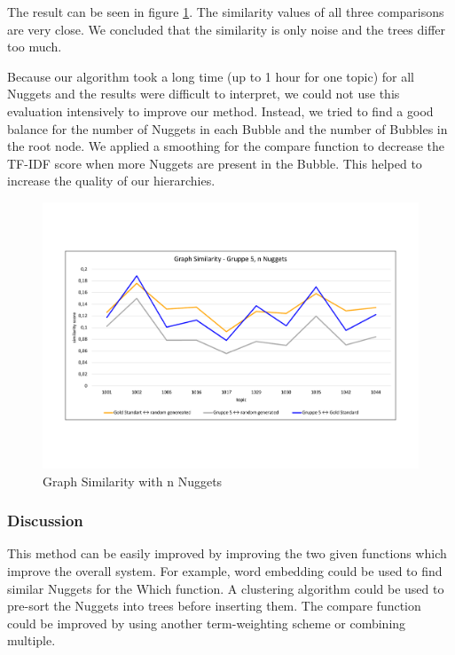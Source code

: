 The result can be seen in figure \ref{fig:graphn}. The similarity values of all three comparisons are very close. We concluded that the similarity is only noise and the trees differ too much.

Because our algorithm took a long time (up to 1 hour for one topic) for all Nuggets and the results were difficult to interpret, we could not use this evaluation intensively to improve our method. Instead, we tried to find a good balance for the number of Nuggets in each Bubble and the number of Bubbles in the root node. We applied a smoothing for the compare function to decrease the TF-IDF score when more Nuggets are present in the Bubble. This helped to increase the quality of our hierarchies.

\begin{figure}[H]
	\centering
	\includegraphics[trim= 0 130 0 130,width=\textwidth]{img/sim_v2.pdf}
	\caption{Graph Similarity with n Nuggets}
	\label{fig:graphn}
\end{figure}



\subsubsection{Discussion}




This method can be easily improved by improving the two given functions which improve the overall system. For example, word embedding could be used to find similar Nuggets for the Which function. A clustering algorithm could be used to pre-sort the Nuggets into trees before inserting them. The compare function could be improved by using another term-weighting scheme or combining multiple.


